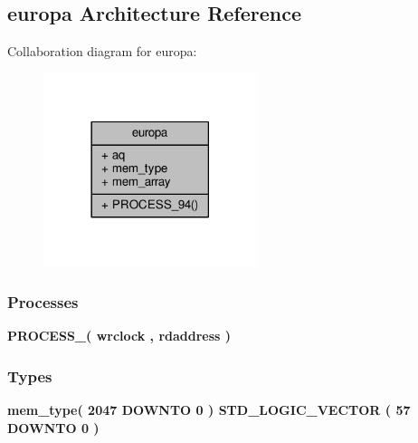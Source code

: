 \subsection{europa Architecture Reference}
\label{classddr2__mem__model__ram__module_1_1europa}


Collaboration diagram for europa\+:\nopagebreak
\begin{figure}[H]
\begin{center}
\leavevmode
\includegraphics[width=177pt]{d5/d52/classddr2__mem__model__ram__module_1_1europa__coll__graph}
\end{center}
\end{figure}
\subsubsection*{Processes}
 \begin{DoxyCompactItemize}
\item 
{\bf P\+R\+O\+C\+E\+S\+S\+\_}{\bfseries  ( {\bfseries {\bfseries {\bf wrclock}} \textcolor{vhdlchar}{ }} , {\bfseries {\bfseries {\bf rdaddress}} \textcolor{vhdlchar}{ }} )}
\end{DoxyCompactItemize}
\subsubsection*{Types}
 \begin{DoxyCompactItemize}
\item 
{\bfseries {\bf mem\+\_\+type}{\bfseries \textcolor{vhdlchar}{(}\textcolor{vhdlchar}{ }\textcolor{vhdlchar}{ } \textcolor{vhdldigit}{2047} \textcolor{vhdlchar}{ }\textcolor{keywordflow}{D\+O\+W\+N\+TO}\textcolor{vhdlchar}{ }\textcolor{vhdlchar}{ } \textcolor{vhdldigit}{0} \textcolor{vhdlchar}{ }\textcolor{vhdlchar}{)}\textcolor{vhdlchar}{ }\textcolor{vhdlchar}{ }\textcolor{comment}{S\+T\+D\+\_\+\+L\+O\+G\+I\+C\+\_\+\+V\+E\+C\+T\+OR}\textcolor{vhdlchar}{ }\textcolor{vhdlchar}{(}\textcolor{vhdlchar}{ }\textcolor{vhdlchar}{ } \textcolor{vhdldigit}{57} \textcolor{vhdlchar}{ }\textcolor{keywordflow}{D\+O\+W\+N\+TO}\textcolor{vhdlchar}{ }\textcolor{vhdlchar}{ } \textcolor{vhdldigit}{0} \textcolor{vhdlchar}{ }\textcolor{vhdlchar}{)}\textcolor{vhdlchar}{ }}} 
\end{DoxyCompactItemize}
